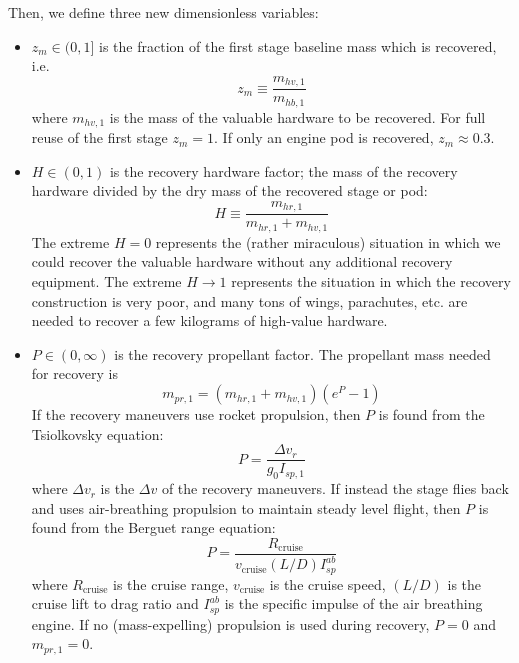 \documentclass[conf]{new-aiaa}
\begin{document}
Then, we define three new dimensionless variables:
\begin{itemize}
    \item $z_m \in (0, 1]$ is the fraction of the first stage baseline mass which is recovered, i.e.
    \begin{equation}
    z_m \equiv \frac{m_{hv,1}}{m_{hb,1}}
    \end{equation}
    where $m_{hv,1}$ is the mass of the valuable hardware to be recovered. For full reuse of the first stage $z_m = 1$. If only an engine pod is recovered, $z_m \approx 0.3$.

    \item $H \in (0, 1)$ is the recovery hardware factor; the mass of the recovery hardware divided by the dry mass of the recovered stage or pod:
    \begin{equation}
    H \equiv \frac{m_{hr,1}}{m_{hr,1} + m_{hv,1}}
    \end{equation}
    The extreme $H=0$ represents the (rather miraculous) situation in which we could recover the valuable hardware without any additional recovery equipment. The extreme $H \rightarrow 1$ represents the situation in which the recovery construction is very poor, and many tons of wings, parachutes, etc. are needed to recover a few kilograms of high-value hardware.

    \item $P \in (0, \infty)$  is the recovery propellant factor. The propellant mass needed for recovery is
    \begin{equation}
    m_{pr,1} = (m_{hr,1} + m_{hv,1}) \left( e^P - 1 \right)
    \end{equation}
    If the recovery maneuvers use rocket propulsion, then $P$ is found from the Tsiolkovsky equation:
    \begin{equation}
    \label{eq:rocket_p}
    P = \frac{\Delta v_r}{g_0 I_{sp,1}}
    \end{equation}
    where $\Delta v_r$ is the $\Delta v$ of the recovery maneuvers. If instead the stage flies back and uses air-breathing propulsion to maintain steady level flight, then $P$ is found from the Berguet range equation:
    \begin{equation}
    \label{eq:berguet_p}
    P =  \frac{R_{\mathrm{cruise}}}{v_{\mathrm{cruise}} (L/D) I_{sp}^{ab}}
    \end{equation}
    where $R_{\mathrm{cruise}}$ is the cruise range, $v_{\mathrm{cruise}}$ is the cruise speed, $(L/D)$ is the cruise lift to drag ratio and $I_{sp}^{ab}$ is the specific impulse of the air breathing engine. If no (mass-expelling) propulsion is used during recovery, $P = 0$ and $m_{pr,1} = 0$.
\end{itemize}
\end{document}
